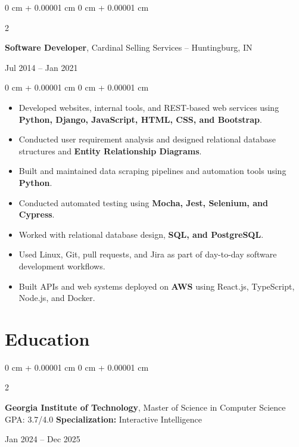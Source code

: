 \documentclass[10pt, letterpaper]{article}
\newenvironment{highlights}{
    \begin{itemize}[
        topsep=0.10 cm,
        parsep=0.10 cm,
        partopsep=0pt,
        itemsep=0pt,
        leftmargin=0 cm + 10pt
    ]
}{
    \end{itemize}
}
\newenvironment{onecolentry}{
    \begin{adjustwidth}{
        0 cm + 0.00001 cm
    }{
        0 cm + 0.00001 cm
    }
}{
    \end{adjustwidth}
}
\newenvironment{twocolentry}[2][]{
    \onecolentry
    \def\secondColumn{#2}
    \setcolumnwidth{\fill, 4.5 cm}
    \begin{paracol}{2}
}{
    \switchcolumn \raggedleft \secondColumn
    \end{paracol}
    \endonecolentry
}
\begin{document}
\vspace{0.3 cm}

\begin{twocolentry}{Jul 2014 -- Jan 2021}
\textbf{Software Developer}, Cardinal Selling Services -- Huntingburg, IN
\end{twocolentry}

\vspace{0.10 cm}

\begin{onecolentry}
\begin{highlights}

\item Developed websites, internal tools, and REST-based web services using \textbf{Python, Django, JavaScript, HTML, CSS, and Bootstrap}.

\item Conducted user requirement analysis and designed relational database structures and \textbf{Entity Relationship Diagrams}.

\item Built and maintained data scraping pipelines and automation tools using \textbf{Python}.

\item Conducted automated testing using \textbf{Mocha, Jest, Selenium, and Cypress}.

\item Worked with relational database design, \textbf{SQL, and PostgreSQL}.

\item Used Linux, Git, pull requests, and Jira as part of day-to-day software development workflows.

\item Built APIs and web systems deployed on \textbf{AWS} using React.js, TypeScript, Node.js, and Docker.

\end{highlights}
\end{onecolentry}

\section{Education}

\begin{twocolentry}{Jan 2024 -- Dec 2025}
\textbf{Georgia Institute of Technology}, Master of Science in Computer Science \\
GPA: 3.7/4.0 \quad \textbf{Specialization:} Interactive Intelligence
\end{twocolentry}
\end{document}
